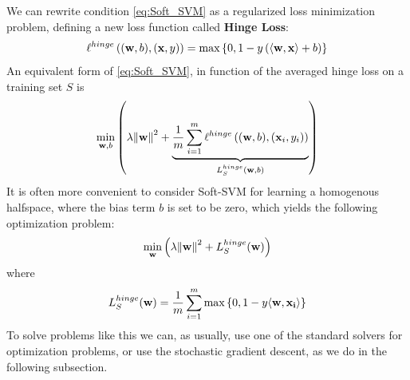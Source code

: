 \documentclass[12pt]{report}
\theoremstyle{plain}
\newcommand\sprod[2]{\langle \vb{#1},\vb{#2}\rangle}
\begin{document}
\begin{flushleft}
\begin{tcolorbox}
	\label{box:Soft_SVM}
\end{tcolorbox}
We can rewrite condition \ref{eq:Soft_SVM} as a regularized loss minimization problem, defining a new loss function called \textbf{Hinge Loss}:
\[ \ell^{hinge}\left((\vb{w},b),(\vb{x},y)\right) = \max\left\{0,1-y\left(\sprod{w}{x}+b\right)\right\} \]
An equivalent form of \ref{eq:Soft_SVM}, in function of the averaged hinge loss on a training set $S$ is
\[ \min_{\vb{w},b}\left(\lambda\norm{\vb{w}}^2+\underbrace{\frac{1}{m}\sum_{i=1}^m \ell^{hinge}\left((\vb{w},b),(\vb{x}_i,y_i)\right)}_{L_S^{hinge}(\vb{w},b)}\right) \]
It is often more convenient to consider Soft-SVM for learning a homogenous halfspace, where the bias term $b$ is set to be zero, which yields the following optimization problem:
\[ \min_{\vb{w}}\left(\lambda\norm{\vb{w}}^2+L_S^{hinge}(\vb{w})\right) \]
where
\[ L_S^{hinge}(\vb{w}) = \frac{1}{m}\sum_{i=1}^m\max\left\{0,1-y\sprod{w}{x_i}\right\} \]
To solve problems like this we can, as usually, use one of the standard solvers for optimization problems, or use the stochastic gradient descent, as we do in the following subsection.


\end{flushleft}
\end{document}
